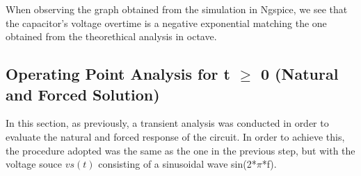  When observing the graph obtained from the simulation in Ngspice, we see that the capacitor's voltage overtime is a negative exponential matching the one obtained from the theorethical analysis in octave.
 
\pagebreak
 
\subsection{Operating Point Analysis for t $\geq$ 0 (Natural and Forced Solution)}
In this section, as previously, a transient analysis was conducted in order to evaluate the natural and forced response of the circuit. In order to achieve this, the procedure adopted was the same as the one in the previous step, but with the voltage souce $vs(t)$ consisting of a sinusoidal wave sin(2*$\pi$*f).  

